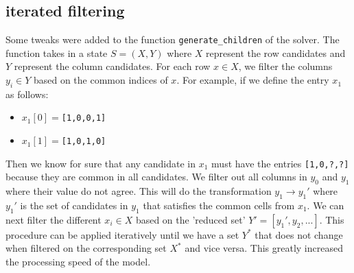 \subsection*{iterated filtering}
Some tweaks were added to the function \texttt{generate\_children} of the solver.
The function takes in a state $S = (X,Y)$ where $X$ represent the row
candidates and $Y$ represent the column candidates. For each row $x \in X$, we
filter the columns $y_i \in Y$ based on the common indices of $x$. For example,
if we define the entry $x_1$ as follows:

\begin{itemize}
    \item $x_1[0] = $\texttt{[1,0,0,1]}
    \item $x_1[1] = $\texttt{[1,0,1,0]}
\end{itemize}

Then we know for sure that any candidate in $x_1$ must have the entries \texttt{[1,0,?,?]}
because they are common in all candidates.  We filter out all columns in $y_0$
and $y_1$ where their value do not agree. This will do the transformation
$y_1 \to y_1'$ where $y_1'$ is the set of candidates in $y_1$ that satisfies the
common cells from $x_1$. We can next filter the different $x_i
\in X$ based on the 'reduced set' $Y' = [y_1', y_2, ...]$. This procedure can
be applied iteratively until we have a set $Y^*$ that does not change when
filtered on the corresponding set $X^*$ and vice versa. This greatly increased
the processing speed of the model.
